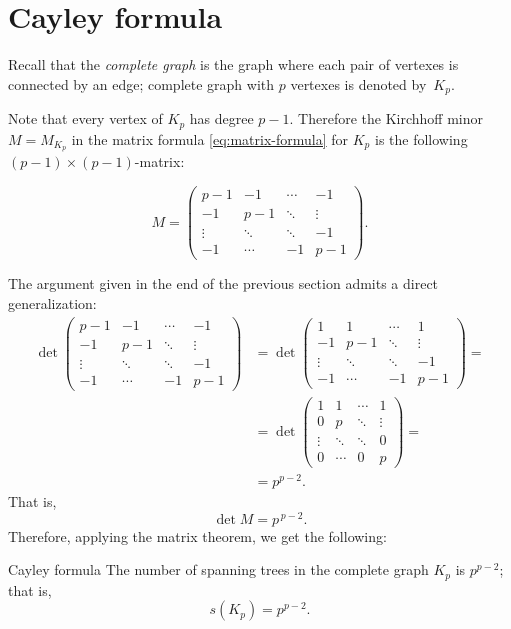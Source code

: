 \section*{Cayley formula}

Recall that the \emph{complete graph} is the graph where each pair of vertexes is connected by an edge;
complete graph with $p$ vertexes is denoted by~$K_p$.

Note that every vertex of $K_p$ has degree $p-1$.
Therefore the Kirchhoff minor $M=M_{K_p}$ in the matrix formula \ref{eq:matrix-formula} for $K_p$ is the following $(p-1)\times (p-1)$-matrix:

\[
M=\left(
\begin{matrix}
p{-}1&-1&\cdots&-1
\\
-1&p{-}1&\ddots&\vdots
\\
\vdots&\ddots&\ddots&-1
\\
-1&\cdots&-1&p{-}1
\end{matrix}
\right).
\]

The argument given in the end of the previous section admits a direct generalization:
\begin{align*}
\det\left(
\begin{matrix}
p{-}1&-1&\cdots&-1
\\
-1&p{-}1&\ddots&\vdots
\\
\vdots&\ddots&\ddots&-1
\\
-1&\cdots&-1&p{-}1
\end{matrix}
\right)
&=\det\left(
\begin{matrix}
1&1&\cdots&1
\\
-1&p{-}1&\ddots&\vdots
\\
\vdots&\ddots&\ddots&-1
\\
-1&\cdots&-1&p{-}1
\end{matrix}
\right)
=
\\
&=
\det\left(
\begin{matrix}
1&1&\cdots&1
\\
0&p&\ddots&\vdots
\\
\vdots&\ddots&\ddots&0
\\
0&\cdots&0&p
\end{matrix}
\right)=
\\
&=  p^{p-2}.
\end{align*}
That is,
\[\det M=p^{\,p-2}.\]
Therefore, applying the matrix theorem, we get the following:

\begin{thm}{Cayley formula}\label{thm:cayley}
The number of spanning trees in the complete graph $K_p$ is $p^{p-2}$; that is,
 \[s(K_p)=p^{p-2}.\]
\end{thm}

